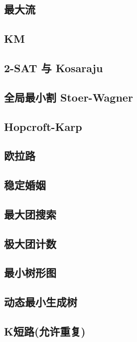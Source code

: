 \documentclass[10pt]{article}
\begin{document}
	\subsection{最大流}
	
	\subsection{KM}

	\subsection{2-SAT 与 Kosaraju}

	\subsection{全局最小割 Stoer-Wagner}

	\subsection{Hopcroft-Karp}

	\subsection{欧拉路}

	\subsection{稳定婚姻}

	\subsection{最大团搜索}
	
	\subsection{极大团计数}

	\subsection{最小树形图}

	\subsection{动态最小生成树}

	\subsection{K短路(允许重复)}
\end{document}

